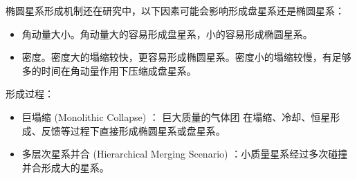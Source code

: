 \documentclass[12pt]{ctexart}
\begin{document}
椭圆星系形成机制还在研究中，以下因素可能会影响形成盘星系还是椭圆星系：
\begin{itemize}
    \item 角动量大小。角动量大的容易形成盘星系，小的容易形成椭圆星系。
    \item 密度。密度大的塌缩较快，更容易形成椭圆星系。密度小的塌缩较慢，有足够多的时间在角动量作用下压缩成盘星系。
\end{itemize}

形成过程：
\begin{itemize}
    \item 巨塌缩 (Monolithic Collapse) ： 巨大质量的气体团 在塌缩、冷却、恒星形成、反馈等过程下直接形成椭圆星系或盘星系。
    \item 多层次星系并合 (Hierarchical Merging Scenario) ：小质量星系经过多次碰撞并合形成大的星系。
\end{itemize}
\end{document}
